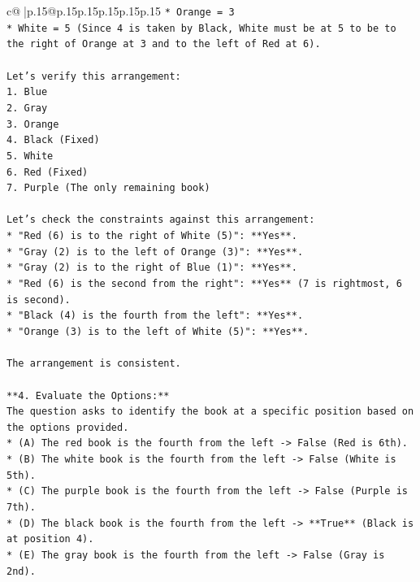 \documentclass{article}
\begin{document}
{\begin{supertabular}{c@{$\;$}|p{.15\linewidth}@{}p{.15\linewidth}p{.15\linewidth}p{.15\linewidth}p{.15\linewidth}p{.15\linewidth}}
{{{\texttt{*   Orange = 3} \\
\texttt{*   White = 5 (Since 4 is taken by Black, White must be at 5 to be to the right of Orange at 3 and to the left of Red at 6).} \\
\\ 
\texttt{Let's verify this arrangement:} \\
\texttt{1.  Blue} \\
\texttt{2.  Gray} \\
\texttt{3.  Orange} \\
\texttt{4.  Black (Fixed)} \\
\texttt{5.  White} \\
\texttt{6.  Red (Fixed)} \\
\texttt{7.  Purple (The only remaining book)} \\
\\ 
\texttt{Let's check the constraints against this arrangement:} \\
\texttt{*   "Red (6) is to the right of White (5)": **Yes**.} \\
\texttt{*   "Gray (2) is to the left of Orange (3)": **Yes**.} \\
\texttt{*   "Gray (2) is to the right of Blue (1)": **Yes**.} \\
\texttt{*   "Red (6) is the second from the right": **Yes** (7 is rightmost, 6 is second).} \\
\texttt{*   "Black (4) is the fourth from the left": **Yes**.} \\
\texttt{*   "Orange (3) is to the left of White (5)": **Yes**.} \\
\\ 
\texttt{The arrangement is consistent.} \\
\\ 
\texttt{**4. Evaluate the Options:**} \\
\texttt{The question asks to identify the book at a specific position based on the options provided.} \\
\texttt{*   (A) The red book is the fourth from the left {-}> False (Red is 6th).} \\
\texttt{*   (B) The white book is the fourth from the left {-}> False (White is 5th).} \\
\texttt{*   (C) The purple book is the fourth from the left {-}> False (Purple is 7th).} \\
\texttt{*   (D) The black book is the fourth from the left {-}> **True** (Black is at position 4).} \\
\texttt{*   (E) The gray book is the fourth from the left {-}> False (Gray is 2nd).} \\
}}}
\end{supertabular}}
\end{document}
